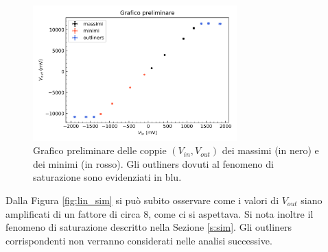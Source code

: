 \documentclass[a4paper,11pt]{article}
\begin{document}
\begin{figure}[h]
\centering
\includegraphics[width=0.7\textwidth]{images/grafico_esplorativo}
\caption{\footnotesize Grafico preliminare delle coppie $(V_{in},V_{out})$ dei massimi (in nero) e dei minimi (in rosso). Gli outliners dovuti al fenomeno di saturazione sono
evidenziati in blu.}\label{fig:lin_prelim}
\end{figure}
Dalla Figura \ref{fig:lin_sim} si può subito osservare come i valori di $V_{out}$ siano amplificati di un
fattore di circa $8$, come ci si aspettava. Si nota inoltre il fenomeno di saturazione
descritto nella Sezione \ref{s:sim}. Gli outliners corrispondenti non verranno considerati nelle
analisi successive.
\end{document}
